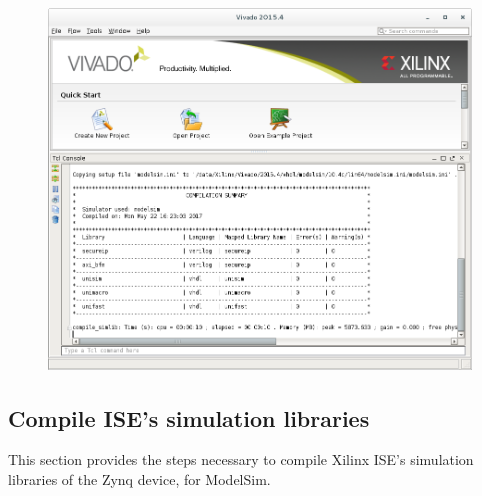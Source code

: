 \begin{flushleft}
\begin{enumerate}
\begin{figure}[H]
	\end{figure}
	\begin{figure}[H]
	\centering\captionsetup{type=figure}\includegraphics[scale=0.5]{xilinx_vivado_2015_compsimlib_out}
	\end{figure}
		\end{enumerate}
\end{flushleft}
\subsection{Compile ISE's simulation libraries}
	This section provides the steps necessary to compile Xilinx ISE's simulation libraries of the Zynq device, for ModelSim.

